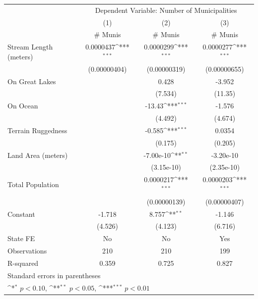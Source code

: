 {
\def\sym#1{\ifmmode^{#1}\else\(^{#1}\)\fi}
\begin{tabular}{l*{3}{c}}
\toprule
                    &\multicolumn{3}{c}{Dependent Variable: Number of Municipalities} \\
                    &\multicolumn{1}{c}{(1)}&\multicolumn{1}{c}{(2)}&\multicolumn{1}{c}{(3)}\\
                    &\multicolumn{1}{c}{\# Munis}&\multicolumn{1}{c}{\# Munis}&\multicolumn{1}{c}{\# Munis}\\
\midrule
Stream Length (meters)&   0.0000437\sym{***}&   0.0000299\sym{***}&   0.0000277\sym{***}\\
                    &(0.00000404)         &(0.00000319)         &(0.00000655)         \\
\addlinespace
On Great Lakes      &                     &       0.428         &      -3.952         \\
                    &                     &     (7.534)         &     (11.35)         \\
\addlinespace
On Ocean            &                     &      -13.43\sym{***}&      -1.576         \\
                    &                     &     (4.492)         &     (4.674)         \\
\addlinespace
Terrain Ruggedness  &                     &      -0.585\sym{***}&      0.0354         \\
                    &                     &     (0.175)         &     (0.205)         \\
\addlinespace
Land Area (meters)  &                     &   -7.00e-10\sym{**} &   -3.20e-10         \\
                    &                     &  (3.15e-10)         &  (2.35e-10)         \\
\addlinespace
Total Population    &                     &   0.0000217\sym{***}&   0.0000203\sym{***}\\
                    &                     &(0.00000139)         &(0.00000407)         \\
\addlinespace
Constant            &      -1.718         &       8.757\sym{**} &      -1.146         \\
                    &     (4.526)         &     (4.123)         &     (6.716)         \\
\midrule
State FE            &          No         &          No         &         Yes         \\
Observations        &         210         &         210         &         199         \\
R-squared           &       0.359         &       0.725         &       0.827         \\
\bottomrule
\multicolumn{4}{l}{\footnotesize Standard errors in parentheses}\\
\multicolumn{4}{l}{\footnotesize \sym{*} \(p<0.10\), \sym{**} \(p<0.05\), \sym{***} \(p<0.01\)}\\
\end{tabular}
}

